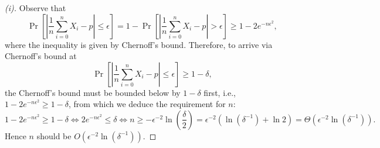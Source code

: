 \begin{proof}[(i)]
    \label{pf:2-i}
    Observe that
    \[
    \Pr\left[\left|\frac{1}{n} \sum_{i=0}^n X_i - p\right| \le \epsilon\right] 
    =1-\Pr\left[\left|\frac{1}{n} \sum_{i=0}^n X_i - p\right| \gt \epsilon\right] 
    \ge 1- 2e^{-n \epsilon^2},
    \]
    where the inequality is given by Chernoff’s bound. Therefore, to arrive via Chernoff’s bound at
    \[
    \Pr\left[\left|\frac{1}{n} \sum_{i=0}^n X_i - p\right| \le \epsilon\right] 
    \ge 1-\delta, 
    \]
    the Chernoff’s bound must be bounded below by $1-\delta$ first, i.e., $ 1- 2e^{-n \epsilon^2} \ge 1-\delta$, from which we deduce the requirement for $n$:
    \[
    1- 2e^{-n \epsilon^2} \ge 1-\delta
    \iff 2e^{-n \epsilon^2} \le \delta
    \iff n\ge -\epsilon^{-2}\ln(\frac{\delta}{2})
    = \epsilon^{-2}(\ln(\delta^{-1})+\ln 2) =  \Theta(\epsilon^{-2}\ln(\delta^{-1})).
    \]
    Hence $n$ should be $O(\epsilon^{-2}\ln(\delta^{-1}))$.
\end{proof}
